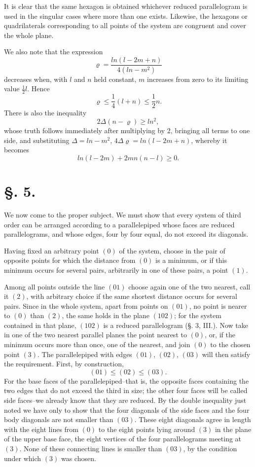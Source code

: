 \documentclass[11pt]{article}
\begin{document}
It is clear that the same hexagon is obtained whichever reduced parallelogram is used in the singular cases where more than one exists. Likewise, the hexagons or quadrilaterals corresponding to all points of the system are congruent and cover the whole plane.

We also note that the expression
\[
 \varrho=\frac{ln(l-2m+n)}{4(ln-m^2)}
\]
decreases when, with $l$ and $n$ held constant, $m$ increases from zero to its limiting value $\frac12 l$. Hence
\begin{equation}
 \varrho\le \frac14(l+n)\le \frac12 n.
\end{equation}
There is also the inequality
\begin{equation}
 2\Delta(n-\varrho)\ge ln^2,
\end{equation}
whose truth follows immediately after multiplying by 2, bringing all terms to one side, and substituting $\Delta=ln-m^2$, $4\Delta\varrho=ln(l-2m+n)$, whereby it becomes
\[
 ln(l-2m)+2mn(n-l)\ge0.
\]

\section*{§. 5.}

We now come to the proper subject. We must show that every system of third order can be arranged according to a parallelepiped whose faces are reduced parallelograms, and whose edges, four by four equal, do not exceed its diagonals.

Having fixed an arbitrary point $(0)$ of the system, choose in the pair of opposite points for which the distance from $(0)$ is a minimum, or if this minimum occurs for several pairs, arbitrarily in one of these pairs, a point $(1)$.

Among all points outside the line $(01)$ choose again one of the two nearest, call it $(2)$, with arbitrary choice if the same shortest distance occurs for several pairs. Since in the whole system, apart from points on $(01)$, no point is nearer to $(0)$ than $(2)$, the same holds in the plane $(102)$; for the system contained in that plane, $(102)$ is a reduced parallelogram (§. 3, III.). Now take in one of the two nearest parallel planes the point nearest to $(0)$, or, if the minimum occurs more than once, one of the nearest, and join $(0)$ to the chosen point $(3)$. The parallelepiped with edges $(01)$, $(02)$, $(03)$ will then satisfy the requirement. First, by construction,
\[
 (01)\le (02)\le (03).
\]
For the base faces of the parallelepiped--that is, the opposite faces containing the two edges that do not exceed the third in size; the other four faces will be called side faces--we already know that they are reduced. By the double inequality just noted we have only to show that the four diagonals of the side faces and the four body diagonals are not smaller than $(03)$. These eight diagonals agree in length with the eight lines from $(0)$ to the eight points lying around $(3)$ in the plane of the upper base face, the eight vertices of the four parallelograms meeting at $(3)$. None of these connecting lines is smaller than $(03)$, by the condition under which $(3)$ was chosen.
\end{document}
